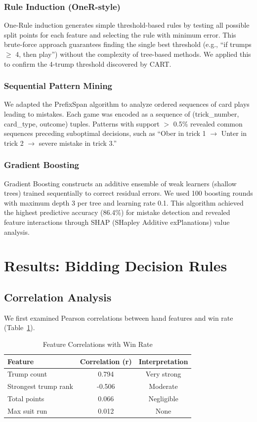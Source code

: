 \documentclass[conference]{IEEEtran}
\begin{document}
\subsubsection{Rule Induction (OneR-style)}
One-Rule induction generates simple threshold-based rules by testing all possible split points for each feature and selecting the rule with minimum error. This brute-force approach guarantees finding the single best threshold (e.g., ``if trumps $\geq$ 4, then play'') without the complexity of tree-based methods. We applied this to confirm the 4-trump threshold discovered by CART.

\subsubsection{Sequential Pattern Mining}
We adapted the PrefixSpan algorithm to analyze ordered sequences of card plays leading to mistakes. Each game was encoded as a sequence of (trick\_number, card\_type, outcome) tuples. Patterns with support $>$ 0.5\% revealed common sequences preceding suboptimal decisions, such as ``Ober in trick 1 $\rightarrow$ Unter in trick 2 $\rightarrow$ severe mistake in trick 3.''

\subsubsection{Gradient Boosting}
Gradient Boosting constructs an additive ensemble of weak learners (shallow trees) trained sequentially to correct residual errors. We used 100 boosting rounds with maximum depth 3 per tree and learning rate 0.1. This algorithm achieved the highest predictive accuracy (86.4\%) for mistake detection and revealed feature interactions through SHAP (SHapley Additive exPlanations) value analysis.

\section{Results: Bidding Decision Rules}

\subsection{Correlation Analysis}

We first examined Pearson correlations between hand features and win rate (Table~\ref{tab:correlations}).

\begin{table}[htbp]
\caption{Feature Correlations with Win Rate}
\begin{center}
\begin{tabular}{lcc}
\toprule
\textbf{Feature} & \textbf{Correlation (r)} & \textbf{Interpretation} \\
\midrule
Trump count & 0.794 & Very strong \\
Strongest trump rank & -0.506 & Moderate \\
Total points & 0.066 & Negligible \\
Max suit run & 0.012 & None \\
\bottomrule
\end{tabular}
\label{tab:correlations}
\end{center}
\end{table}
\end{document}
